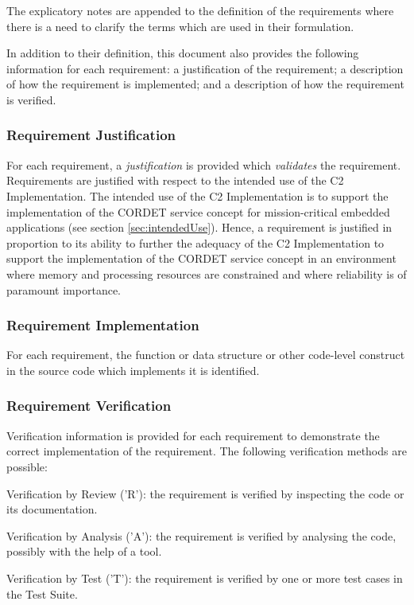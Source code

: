\documentclass[a4paper,10pt]{article}
\newenvironment{fw_itemize}						%
{\begin{itemize}
  \setlength{\itemsep}{1mm}
  \setlength{\parskip}{0pt}
  \setlength{\parsep}{0pt}}
{\end{itemize}}
\begin{document}
The explicatory notes are appended to the definition of the requirements where there is a need to clarify the terms which are used in their formulation.

In addition to their definition, this document also provides the following information for each requirement: a justification of the requirement; a description of how the requirement is implemented; and a description of how the requirement is verified. 

\subsubsection{Requirement Justification}
For each requirement, a \emph{justification} is provided which \emph{validates} the requirement. Requirements are justified with respect to the intended use of the C2 Implementation. The intended use of the C2 Implementation is to support the implementation of the CORDET service concept for mission-critical embedded applications (see section \ref{sec:intendedUse}).  Hence, a requirement is justified in proportion to its ability to further the adequacy of the C2 Implementation to support the implementation of the CORDET service concept in an environment where memory and processing resources are constrained and where reliability is of paramount importance. 

\subsubsection{Requirement Implementation}
For each requirement, the function or data structure or other code-level construct in the source code which implements it is identified.

\subsubsection{Requirement Verification}\label{sec:reqVer}
Verification information is provided for each requirement to demonstrate the correct implementation of the requirement. The following verification methods are possible:

\begin{fw_itemize}
\item Verification by Review ('R'): the requirement is verified by inspecting the code or its documentation.
\item Verification by Analysis ('A'): the requirement is verified by analysing the code, possibly with the help of a tool.
\item Verification by Test ('T'): the requirement is verified by one or more test cases in the Test Suite.
\end{fw_itemize}
\end{document}
